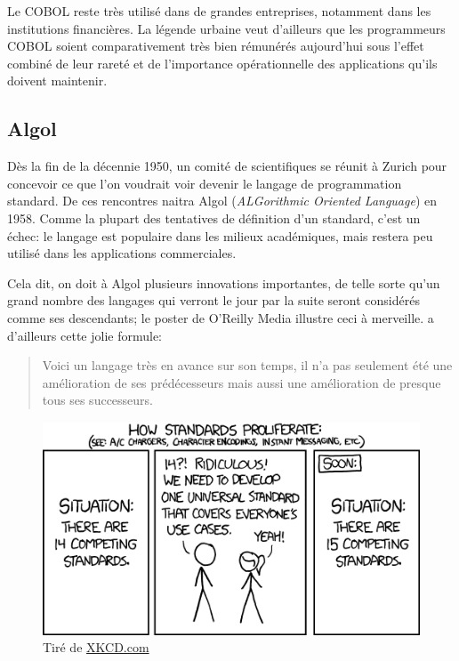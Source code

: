 Le COBOL reste très utilisé dans de grandes entreprises, notamment
dans les institutions financières. La légende urbaine veut d'ailleurs
que les programmeurs COBOL soient comparativement très bien rémunérés
aujourd'hui sous l'effet combiné de leur rareté et de l'importance
opérationnelle des applications qu'ils doivent maintenir.

\subsection{Algol}
\label{sec:informatique:historique:algol}

Dès la fin de la décennie 1950, un comité de scientifiques se réunit à
Zurich pour concevoir ce que l'on voudrait voir devenir le langage de
programmation standard. De ces rencontres naitra Algol
(\emph{ALGorithmic Oriented Language}) en 1958. Comme la plupart des
tentatives de définition d'un standard, c'est un échec: le langage est
populaire dans les milieux académiques, mais restera peu utilisé dans
les applications commerciales.

Cela dit, on doit à Algol plusieurs innovations importantes, de telle
sorte qu'un grand nombre des langages qui verront le jour par la suite
seront considérés comme ses descendants; le poster
 de O'Reilly Media illustre ceci à
merveille. \citet{Hoare:1973} a d'ailleurs cette jolie formule:
\begin{quote}
  Voici un langage très en avance sur son temps, il n'a pas seulement
  été une amélioration de ses prédécesseurs mais aussi une
  amélioration de presque tous ses successeurs.
\end{quote}

\begin{figure}[t]
  \centering
  \begin{minipage}{0.9\linewidth}
    \includegraphics{standards} \\
    \footnotesize\sffamily%
    Tiré de \href{http://xkcd.com/927/}{XKCD.com}
  \end{minipage}
\end{figure}

